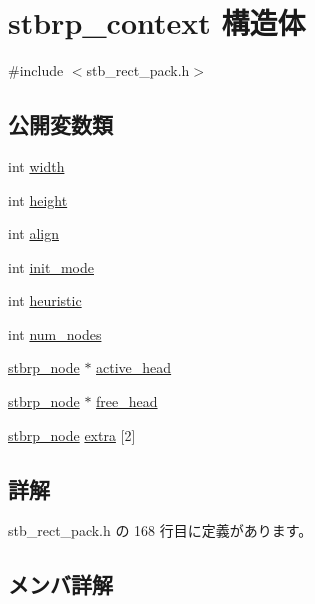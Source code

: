 \hypertarget{structstbrp__context}{}\section{stbrp\+\_\+context 構造体}
\label{structstbrp__context}


{\ttfamily \#include $<$stb\+\_\+rect\+\_\+pack.\+h$>$}

\subsection*{公開変数類}
\begin{DoxyCompactItemize}
\item 
int \mbox{\hyperlink{structstbrp__context_a70cfcb2044ce8397cc440d28b30c09b2}{width}}
\item 
int \mbox{\hyperlink{structstbrp__context_af3715a6f3faecfb4fac8f6ccbb71f9c7}{height}}
\item 
int \mbox{\hyperlink{structstbrp__context_ae36053e2001a725aec2b5756dc990481}{align}}
\item 
int \mbox{\hyperlink{structstbrp__context_a007509feee322404083034e4c2d3dc5d}{init\+\_\+mode}}
\item 
int \mbox{\hyperlink{structstbrp__context_a4b61a7f94e50a54c075e2a8f99f6503a}{heuristic}}
\item 
int \mbox{\hyperlink{structstbrp__context_afa8105d4ef6d3e0ae5aaf8e1ed4b2c58}{num\+\_\+nodes}}
\item 
\mbox{\hyperlink{structstbrp__node}{stbrp\+\_\+node}} $\ast$ \mbox{\hyperlink{structstbrp__context_a13277239636803aff28f00b0a0376120}{active\+\_\+head}}
\item 
\mbox{\hyperlink{structstbrp__node}{stbrp\+\_\+node}} $\ast$ \mbox{\hyperlink{structstbrp__context_a1336ae32373663847866cc65904c2839}{free\+\_\+head}}
\item 
\mbox{\hyperlink{structstbrp__node}{stbrp\+\_\+node}} \mbox{\hyperlink{structstbrp__context_a0b80e1fbdac125427526f3500d4e7624}{extra}} \mbox{[}2\mbox{]}
\end{DoxyCompactItemize}


\subsection{詳解}


 stb\+\_\+rect\+\_\+pack.\+h の 168 行目に定義があります。



\subsection{メンバ詳解}
\mbox{\label{structstbrp__context_a13277239636803aff28f00b0a0376120}} 

